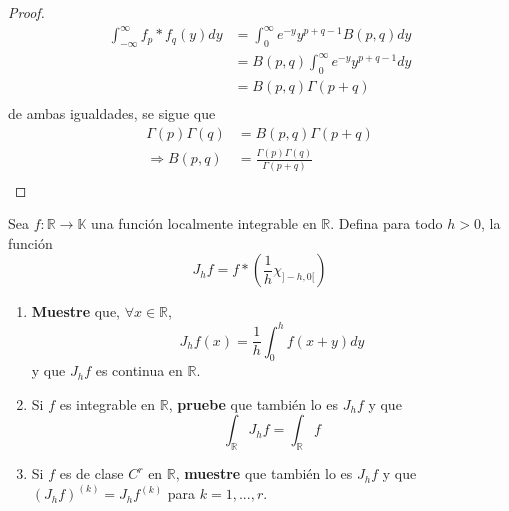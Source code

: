 \documentclass[12pt]{report}
\newcounter{it}
\theoremstyle{largebreak}
\newcommand\cf[3]{\ensuremath{#1:#2\rightarrow#3}}
\begin{document}
\begin{proof}
\begin{equation*}
            \begin{split}
                \int_{-\infty}^\infty f_p*f_q(y)dy&=\int_0^\infty e^{-y}y^{ p+q-1}B(p,q)dy \\
                &=B(p,q)\int_0^\infty e^{-y}y^{ p+q-1}dy \\
                &=B(p,q)\Gamma(p+q) \\
            \end{split}
        \end{equation*}
        de ambas igualdades, se sigue que
        \begin{equation*}
            \begin{split}
                \Gamma(p)\Gamma(q)&=B(p,q)\Gamma(p+q)\\
                \Rightarrow B(p,q)&=\frac{\Gamma(p)\Gamma(q)}{\Gamma(p+q)}\\
            \end{split}
        \end{equation*}
    \end{proof}

    \begin{excer}
        Sea $\cf{f}{\mathbb{R}}{\mathbb{K}}$ una función localmente integrable en $\mathbb{R}$. Defina para todo $h>0$, la función
        \begin{equation*}
            J_hf=f*\left(\frac{1}{h}\chi_{]-h,0[}\right)
        \end{equation*}
        \begin{enumerate}
            \item \textbf{Muestre} que, $\forall x\in\mathbb{R}$,
            \begin{equation*}
                J_hf(x)=\frac{1}{h}\int_0^hf(x+y)dy
            \end{equation*}
            y que $J_hf$ es continua en $\mathbb{R}$.
            \item Si $f$ es integrable en $\mathbb{R}$, \textbf{pruebe} que también lo es $J_hf$ y que
            \begin{equation*}
                \int_\mathbb{R}J_hf=\int_{\mathbb{R}}f
            \end{equation*}
            \item Si $f$ es de clase $C^r$ en $\mathbb{R}$, \textbf{muestre} que también lo es $J_hf$ y que $\left(J_hf\right)^{(k)}=J_hf^{(k)}$ para $k=1,...,r$.
        \end{enumerate}
    \end{excer}
\end{document}
